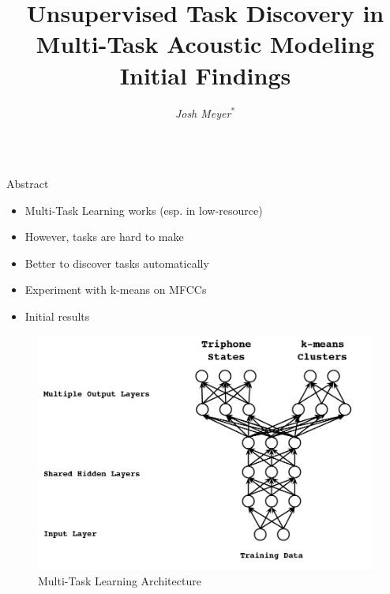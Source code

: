 \documentclass[final]{beamer} %
\title{Unsupervised Task Discovery in Multi-Task Acoustic Modeling \\ \vspace{0.3em} Initial Findings}
\author{
  \textit{Josh Meyer}$^*$}
\institute{$*$ University of Arizona}
\newlength{\columnheight}
\begin{document}


\begin{frame}
  \begin{columns}
    \begin{column}{0.3\textwidth}
      \parbox[t][\columnheight]{.9\textwidth}{
        \begin{block}{Abstract}
          \begin{itshape}   %
            \begin{itemize}
            \item Multi-Task Learning works (esp. in low-resource)
            \item However, tasks are hard to make
            \item Better to discover tasks automatically
            \item Experiment with k-means on MFCCs
            \item Initial results
            \end{itemize}
          \end{itshape}
        \end{block}

        \vspace{.5cm}

        \begin{figure}[!htbp]
          \centering
          \includegraphics[width=\linewidth]{figs/heigold-2013-dnn-c.png}
          \caption{Multi-Task Learning Architecture}
          \label{fig:mtl-dnn}
          \endminipage\hfill
        \end{figure}
        
}
\end{column}
\end{columns}
\end{frame}
\end{document}
